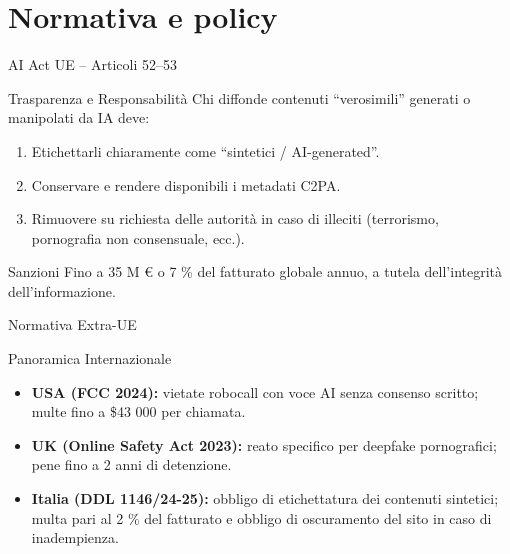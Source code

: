 \documentclass[12pt]{beamer}
\begin{document}
\section{Normativa e policy}
\begin{frame}{AI Act UE – Articoli 52–53}
  \begin{alertblock}{Trasparenza e Responsabilità}
    Chi diffonde contenuti “verosimili” generati o manipolati da IA deve:
    \begin{enumerate}
      \item Etichettarli chiaramente come “sintetici / AI-generated”.
      \item Conservare e rendere disponibili i metadati C2PA.
      \item Rimuovere su richiesta delle autorità in caso di illeciti (terrorismo, pornografia non consensuale, ecc.).
    \end{enumerate}
  \end{alertblock}
  \begin{alertblock}{Sanzioni}
    Fino a 35 M € o 7 \% del fatturato globale annuo, a tutela dell’integrità dell’informazione.
  \end{alertblock}
\end{frame}

\begin{frame}{Normativa Extra-UE}
  \small
  \begin{alertblock}{Panoramica Internazionale}
    \begin{itemize}
      \item \textbf{USA (FCC 2024):} vietate robocall con voce AI senza consenso scritto; multe fino a \$43 000 per chiamata.\cite{fcc_voice_2024}
      \item \textbf{UK (Online Safety Act 2023):} reato specifico per deepfake pornografici; pene fino a 2 anni di detenzione.
      \item \textbf{Italia (DDL 1146/24-25):} obbligo di etichettatura dei contenuti sintetici; multa pari al 2 \% del fatturato e obbligo di oscuramento del sito in caso di inadempienza.\cite{senato_ddl1146}
    \end{itemize}
  \end{alertblock}
\end{frame}


\end{document}
